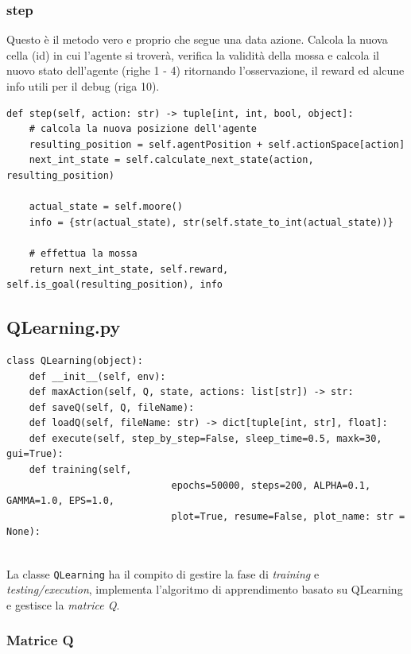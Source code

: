 \subsubsection{step}
Questo \`{e} il metodo vero e proprio che segue una data azione. Calcola la nuova cella (id) in cui l'agente si trover\`{a}, verifica la validit\`{a} della mossa e calcola il nuovo stato dell'agente (righe 1 - 4) ritornando l'osservazione, il reward ed alcune info utili per il debug (riga 10).\\

\begin{lstlisting}[style=python, caption={Codice del metodo step}]
def step(self, action: str) -> tuple[int, int, bool, object]:
	# calcola la nuova posizione dell'agente
	resulting_position = self.agentPosition + self.actionSpace[action]
	next_int_state = self.calculate_next_state(action, resulting_position)

	actual_state = self.moore()
	info = {str(actual_state), str(self.state_to_int(actual_state))}

	# effettua la mossa
	return next_int_state, self.reward, self.is_goal(resulting_position), info

\end{lstlisting}

\subsection{QLearning.py}

\begin{lstlisting}[style=python, caption={Metodi di QLearning.py}]
class QLearning(object):
	def __init__(self, env):
	def maxAction(self, Q, state, actions: list[str]) -> str:
	def saveQ(self, Q, fileName):
	def loadQ(self, fileName: str) -> dict[tuple[int, str], float]:
	def execute(self, step_by_step=False, sleep_time=0.5, maxk=30, gui=True):
	def training(self, 
							 epochs=50000, steps=200, ALPHA=0.1, GAMMA=1.0, EPS=1.0, 
							 plot=True, resume=False, plot_name: str = None):
	
\end{lstlisting}

La classe \lstinline[style=cmd]|QLearning| ha il compito di gestire la fase di \textit{training} e \textit{testing/execution}, implementa l'algoritmo di apprendimento basato su QLearning e gestisce la \textit{matrice Q}.

\subsubsection{Matrice Q}
\label{sec:matriceQ}


